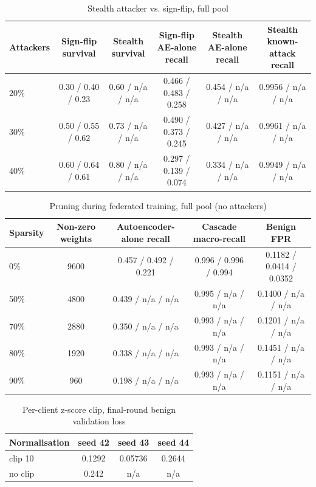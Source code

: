 \begin{table}[H]
\centering
\scriptsize
\setlength{\tabcolsep}{3pt}
\renewcommand{\arraystretch}{1.15}
\begin{tabular}{|l|c|c|c|c|c|}
\hline
\textbf{Attackers} & \textbf{Sign-flip survival} & \textbf{Stealth survival} & \textbf{Sign-flip AE-alone recall} & \textbf{Stealth AE-alone recall} & \textbf{Stealth known-attack recall} \\ \hline
20\% & 0.30 / 0.40 / 0.23 & 0.60 / n/a / n/a & 0.466 / 0.483 / 0.258 & 0.454 / n/a / n/a & 0.9956 / n/a / n/a \\ \hline
30\% & 0.50 / 0.55 / 0.62 & 0.73 / n/a / n/a & 0.490 / 0.373 / 0.245 & 0.427 / n/a / n/a & 0.9961 / n/a / n/a \\ \hline
40\% & 0.60 / 0.64 / 0.61 & 0.80 / n/a / n/a & 0.297 / 0.139 / 0.074 & 0.334 / n/a / n/a & 0.9949 / n/a / n/a \\ \hline
\end{tabular}
\caption{Stealth attacker vs. sign-flip, full pool}
\label{tab:full_stealth}
\end{table}
\begin{table}[H]
\centering
\scriptsize
\setlength{\tabcolsep}{3pt}
\renewcommand{\arraystretch}{1.15}
\begin{tabular}{|l|c|c|c|c|}
\hline
\textbf{Sparsity} & \textbf{Non-zero weights} & \textbf{Autoencoder-alone recall} & \textbf{Cascade macro-recall} & \textbf{Benign FPR} \\ \hline
0\% & 9600 & 0.457 / 0.492 / 0.221 & 0.996 / 0.996 / 0.994 & 0.1182 / 0.0414 / 0.0352 \\ \hline
50\% & 4800 & 0.439 / n/a / n/a & 0.995 / n/a / n/a & 0.1400 / n/a / n/a \\ \hline
70\% & 2880 & 0.350 / n/a / n/a & 0.993 / n/a / n/a & 0.1201 / n/a / n/a \\ \hline
80\% & 1920 & 0.338 / n/a / n/a & 0.993 / n/a / n/a & 0.1451 / n/a / n/a \\ \hline
90\% & 960 & 0.198 / n/a / n/a & 0.993 / n/a / n/a & 0.1151 / n/a / n/a \\ \hline
\end{tabular}
\caption{Pruning during federated training, full pool (no attackers)}
\label{tab:full_pruning}
\end{table}
\begin{table}[H]
\centering
\small
\setlength{\tabcolsep}{3pt}
\renewcommand{\arraystretch}{1.15}
\begin{tabular}{|l|c|c|c|}
\hline
\textbf{Normalisation} & \textbf{seed 42} & \textbf{seed 43} & \textbf{seed 44} \\ \hline
clip 10 & 0.1292 & 0.05736 & 0.2644 \\ \hline
no clip & 0.242 & n/a & n/a \\ \hline
\end{tabular}
\caption{Per-client z-score clip, final-round benign validation loss}
\label{tab:full_clip}
\end{table}
